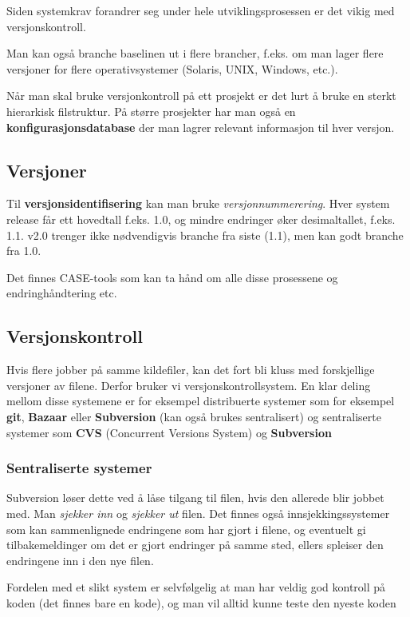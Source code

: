 \documentclass[11pt]{article}
\begin{document}
  Siden systemkrav forandrer seg under hele utviklingsprosessen er det vikig med versjonskontroll. 
  
  Man kan også branche baselinen ut i flere brancher, f.eks. om man lager flere versjoner for 
  flere operativsystemer (Solaris, UNIX, Windows, etc.). 
  
  Når man skal bruke versjonkontroll på ett prosjekt er det lurt å bruke en sterkt 
  hierarkisk filstruktur. På større prosjekter har man også en \textbf{konfigurasjonsdatabase}
  der man lagrer relevant informasjon til hver versjon.
\subsection{Versjoner}
\label{sec-16.1}


  Til \textbf{versjonsidentifisering} kan man bruke \emph{versjonnummerering}. Hver system release 
  får ett hovedtall f.eks. 1.0, og mindre endringer øker desimaltallet, f.eks. 1.1. v2.0 
  trenger ikke nødvendigvis branche fra siste (1.1), men kan godt branche fra 1.0.
   
  Det finnes CASE-tools som kan ta hånd om alle disse prosessene og endringhåndtering etc.
\subsection{Versjonskontroll}
\label{sec-16.2}

   Hvis flere jobber på samme kildefiler, kan det fort bli kluss med forskjellige versjoner av filene. 
   Derfor bruker vi versjonskontrollsystem.
   En klar deling mellom disse systemene er for eksempel distribuerte systemer
   som for eksempel \textbf{git}, \textbf{Bazaar} eller \textbf{Subversion} (kan også brukes sentralisert)
   og sentraliserte systemer som \textbf{CVS} (Concurrent Versions System) og \textbf{Subversion}
\subsubsection{Sentraliserte systemer}
\label{sec-16.2.1}

    Subversion løser dette ved å låse tilgang til filen, hvis den allerede blir jobbet med. 
    Man \emph{sjekker inn} og \emph{sjekker ut} filen.
    Det finnes også innsjekkingssystemer som kan sammenlignede endringene som har gjort i filene, 
    og eventuelt gi tilbakemeldinger om det er gjort endringer på samme sted, ellers 
    spleiser den endringene inn i den nye filen.
    
    Fordelen med et slikt system er selvfølgelig at man har veldig god kontroll på koden
    (det finnes bare en kode), og man vil alltid kunne teste den nyeste koden
    
\end{document}
